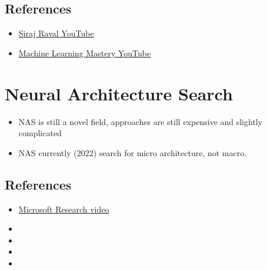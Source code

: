 \section{References}
\begin{itemize}
	\item \href{https://youtu.be/ttE0F7fghfk}{Siraj Raval YouTube}
	\item \href{https://www.youtube.com/channel/UCS1dQr2X_ComHN4PXYDS4gA}{Machine Learning Mastery YouTube}
\end{itemize}

\chapter{Neural Architecture Search}
\begin{itemize}
	\item \ac{NAS} is still a novel field, approaches are still expensive and slightly complicated
	\item \ac{NAS} currently (2022) search for micro architecture, not macro.
\end{itemize}

\section{References}
\begin{itemize}
	\item \href{https://youtu.be/wL-p5cjDG64}{Microsoft Research video}
	\item {}
	\item {}
	\item {}
	\item {}
\end{itemize}